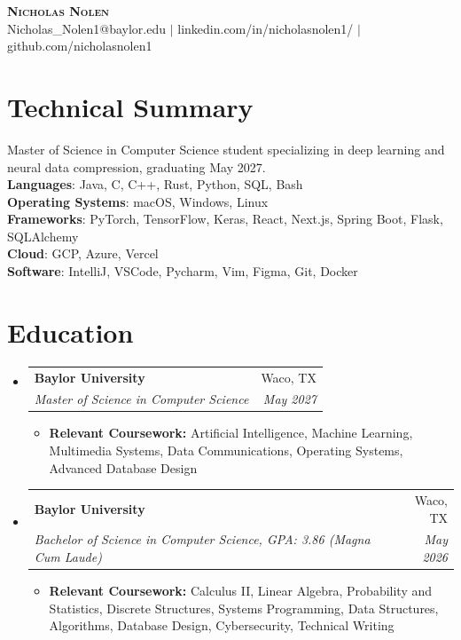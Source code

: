 \documentclass[letterpaper,11pt]{article}
\makeatletter
\newcommand{\resumeItem}[1]{
  \item\small{
    {#1 \vspace{-2pt}}
  }
}
\newcommand{\resumeSubheading}[4]{
  \vspace{-1pt}\item
    \begin{tabular*}{0.97\textwidth}[t]{l@{\extracolsep{\fill}}r}
      \textbf{#1} & #2 \\
      \textit{\small#3} & \textit{\small #4} \\
    \end{tabular*}\vspace{-7pt}
}
\newcommand{\resumeSubHeadingListStart}{\begin{itemize}[leftmargin=0.15in, label={}]}
\newcommand{\resumeSubHeadingListEnd}{\end{itemize}}
\newcommand{\resumeItemListStart}{\begin{itemize}[leftmargin=0.2in]}
\newcommand{\resumeItemListEnd}{\end{itemize}\vspace{-5pt}}
\makeatother
\begin{document}
\begin{center}
    \textbf{\Huge \scshape Nicholas Nolen} \\ \vspace{1pt}
    \small Nicholas\_Nolen1@baylor.edu $|$ 
    linkedin.com/in/nicholasnolen1/ $|$
    github.com/nicholasnolen1
\end{center}

\section{Technical Summary}
 \begin{itemize}[leftmargin=0.15in, label={}]
    \small{\item{
     Master of Science in Computer Science student specializing in deep learning and neural data compression, graduating May 2027. \\ \vspace{2pt}
     \textbf{Languages}{: Java, C, C++, Rust, Python, SQL, Bash} \\
     \textbf{Operating Systems}{: macOS, Windows, Linux} \\
     \textbf{Frameworks}{: PyTorch, TensorFlow, Keras, React, Next.js, Spring Boot, Flask, SQLAlchemy} \\ 
     \textbf{Cloud}{: GCP, Azure, Vercel} \\ 
     \textbf{Software}{: IntelliJ, VSCode, Pycharm, Vim, Figma, Git, Docker}
    }}
 \end{itemize}


\section{Education}
  \resumeSubHeadingListStart
    \resumeSubheading
      {Baylor University}{Waco, TX}
      {Master of Science in Computer Science}{May 2027}
      \resumeItemListStart
        \resumeItem{\textbf{Relevant Coursework:} Artificial Intelligence, Machine Learning, Multimedia Systems, Data Communications, Operating Systems, Advanced Database Design}
      \resumeItemListEnd
    \resumeSubheading
      {Baylor University}{Waco, TX}
      {Bachelor of Science in Computer Science, GPA: 3.86 (Magna Cum Laude)}{May 2026}
      \resumeItemListStart
        \resumeItem{\textbf{Relevant Coursework:} Calculus II, Linear Algebra, Probability and Statistics, Discrete Structures, Systems Programming, Data Structures, Algorithms, Database Design, Cybersecurity, Technical Writing}
      \resumeItemListEnd
  \resumeSubHeadingListEnd
\end{document}
